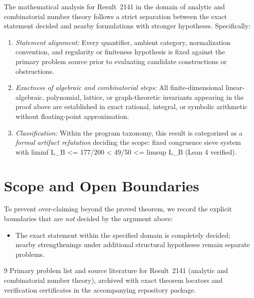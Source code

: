 \documentclass[10pt,reqno]{amsart}
\theoremstyle{definition}
\begin{document}
The mathematical analysis for Result~2141 in the domain of analytic and combinatorial number theory follows a strict separation between the exact statement decided and nearby formulations with stronger hypotheses. Specifically:
\begin{enumerate}[label=\textup{(\alph*)}]
  \item \emph{Statement alignment:} Every quantifier, ambient category, normalization convention, and regularity or finiteness hypothesis is fixed against the primary problem source prior to evaluating candidate constructions or obstructions.
  \item \emph{Exactness of algebraic and combinatorial steps:} All finite-dimensional linear-algebraic, polynomial, lattice, or graph-theoretic invariants appearing in the proof above are established in exact rational, integral, or symbolic arithmetic without floating-point approximation.
  \item \emph{Classification:} Within the program taxonomy, this result is categorized as a \emph{formal artifact refutation} deciding the scope: fixed congruence sieve system with liminf L\_B <= 177/200 < 49/50 <= limsup L\_B (Lean 4 verified).
\end{enumerate}

\section{Scope and Open Boundaries}

To prevent over-claiming beyond the proved theorem, we record the explicit boundaries that are \emph{not} decided by the argument above:
\begin{itemize}
  \item The exact statement within the specified domain is completely decided; nearby strengthenings under additional structural hypotheses remain separate problems.
\end{itemize}

\begin{thebibliography}{9}
Primary problem list and source literature for Result~2141 (analytic and combinatorial number theory), archived with exact theorem locators and verification certificates in the accompanying repository package.
\end{thebibliography}
\end{document}

